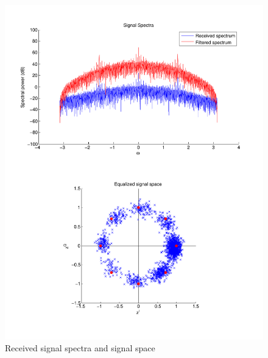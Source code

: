 \documentclass[11pt]{scrartcl}
\begin{document}
\begin{figure}
    \centering
    \includegraphics[width=1.0\textwidth]{figures/receivedspectra.pdf}
    \caption{Received signal spectra and signal space}
\end{figure}
\end{document}
